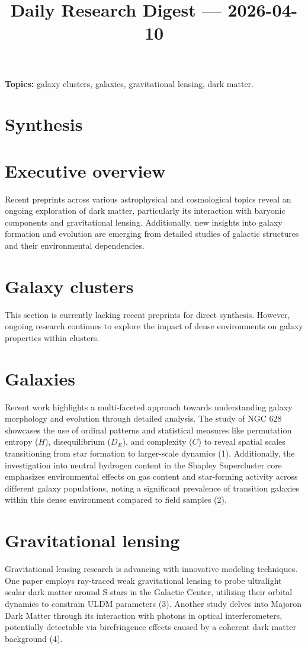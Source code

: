 \documentclass[11pt]{article}
\begin{document}
\title{Daily Research Digest --- 2026-04-10}
\author{}
\date{}
\maketitle
\textbf{Topics:} galaxy clusters, galaxies, gravitational lensing, dark matter.
\section*{Synthesis}
\section*{Executive overview}
Recent preprints across various astrophysical and cosmological topics reveal an ongoing exploration of dark matter, particularly its interaction with baryonic components and gravitational lensing. Additionally, new insights into galaxy formation and evolution are emerging from detailed studies of galactic structures and their environmental dependencies.
\section*{Galaxy clusters}
This section is currently lacking recent preprints for direct synthesis. However, ongoing research continues to explore the impact of dense environments on galaxy properties within clusters.
\section*{Galaxies}
Recent work highlights a multi-faceted approach towards understanding galaxy morphology and evolution through detailed analysis. The study of NGC 628 showcases the use of ordinal patterns and statistical measures like permutation entropy ($H$), disequilibrium ($D_E$), and complexity ($C$) to reveal spatial scales transitioning from star formation to larger-scale dynamics (1). Additionally, the investigation into neutral hydrogen content in the Shapley Supercluster core emphasizes environmental effects on gas content and star-forming activity across different galaxy populations, noting a significant prevalence of transition galaxies within this dense environment compared to field samples (2).
\section*{Gravitational lensing}
Gravitational lensing research is advancing with innovative modeling techniques. One paper employs ray-traced weak gravitational lensing to probe ultralight scalar dark matter around S-stars in the Galactic Center, utilizing their orbital dynamics to constrain ULDM parameters (3). Another study delves into Majoron Dark Matter through its interaction with photons in optical interferometers, potentially detectable via birefringence effects caused by a coherent dark matter background (4).
\end{document}
